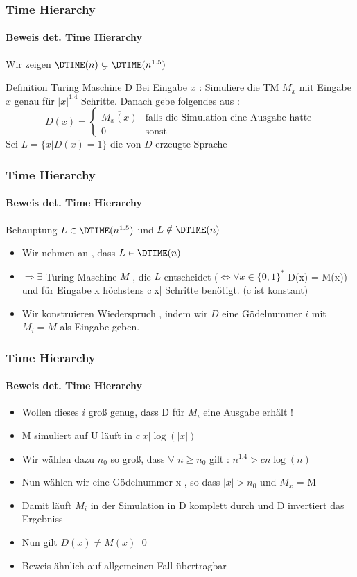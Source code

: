 \begin{frame}
	\frametitle{Time Hierarchy}
	\framesubtitle{{Beweis det. Time Hierarchy}}
	Wir zeigen $\DTIME(n) \subsetneq \DTIME(n^{1.5})$
	\bigskip
	\pause
	\begin{KITinfoblock}{Definition Turing Maschine D} 
		Bei Eingabe $x$ : Simuliere die TM $M_x$ mit Eingabe $x$ genau für $|x|^{1.4}$
		 						Schritte. Danach gebe folgendes aus :
		\begin{equation*}
		D(x) = 
		\begin{cases}
			\overline{M_x(x)} & \text{falls die Simulation eine Ausgabe hatte} \\
			0 & \text{sonst}
			
		\end{cases}
		\end{equation*}			
		\bigskip
		Sei $L =  \lbrace x \vert D(x) = 1  \rbrace$ die von $D$ erzeugte Sprache
	\end{KITinfoblock}
\end{frame}

\begin{frame}
	\frametitle{Time Hierarchy}
	\framesubtitle{Beweis det. Time Hierarchy}
	\begin{KITblock}{Behauptung}
		$L \in \DTIME(n^{1.5})$ und $L \notin \DTIME(n)$
	\end{KITblock}
	\pause
	\begin{itemize}[<+->]
		\item Wir nehmen an , dass $L \in \DTIME(n)$
		\item $\Rightarrow \exists$ Turing Maschine $M$ , die $L$ entscheidet \newline
		($\Leftrightarrow \forall x \in {\lbrace 0,1 \rbrace }^{*}$ D(x) = M(x)) und
		für Eingabe x höchstens c|x| Schritte benötigt. (c ist konstant)
		\item Wir konstruieren Wiederspruch , indem wir $D$ eine Gödelnummer $i$ mit
			$M_i = M$ als Eingabe geben.
	\end{itemize}
\end{frame}

\begin{frame}
	\frametitle{Time Hierarchy}
	\framesubtitle{Beweis det. Time Hierarchy}
	\begin{itemize}[<+->]
		\item Wollen dieses $i$ groß genug, dass D für $M_i$ eine Ausgabe erhält !
		\item M simuliert auf U läuft in $c|x|\log(|x|)$
		\item Wir wählen dazu $n_0$ so groß, dass $\forall$ $n \geq n_0$ gilt :
			$n^{1.4} > cn\log(n)$		
		\item Nun wählen wir eine Gödelnummer x , so dass $|x| > n_0$ und $M_x$ = M
		\item Damit läuft $M_i$ in der Simulation in D komplett durch und D invertiert
			das Ergebniss
		\item Nun gilt $D(x) \neq M(x)$ 	\qed 
		\item Beweis ähnlich auf allgemeinen Fall übertragbar
	\end{itemize}
\end{frame}
